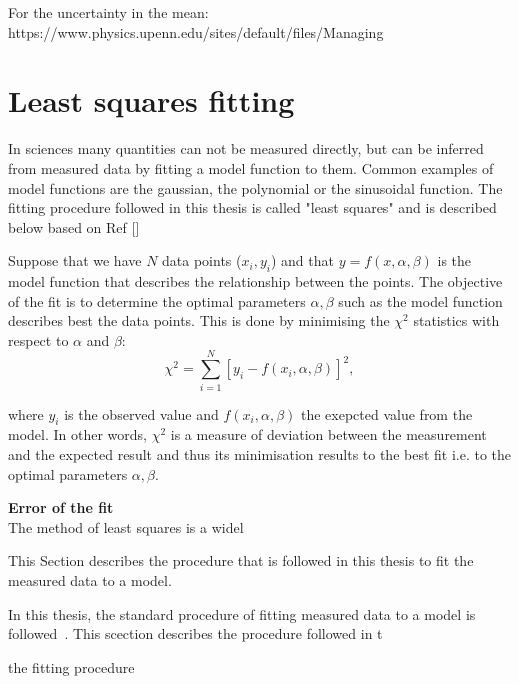For the uncertainty in the mean:
https://www.physics.upenn.edu/sites/default/files/Managing%


\section{Least squares fitting}\label{app:non_linear_fitting}
In sciences many quantities can not be measured directly, but can be inferred from measured data by fitting a model function to them. Common examples of model functions are the gaussian, the polynomial or the sinusoidal function. The fitting procedure followed in this thesis is called "least squares" and is described below based on Ref []

Suppose that we have $N$ data points ($x_{i}, y_{i}$) and that $y=f(x,\alpha, \beta)$ is the model function that describes the relationship between the points. The objective of the fit is to determine the optimal parameters $\alpha, \beta$ such as the model function describes best the data points. This is done by minimising the $\chi^2$ statistics with respect to $\alpha$ and $\beta$:
\begin{equation}\label{eq:chi_square}
    \chi^2 = \sum_{i=1}^{N}[y_{i}-f(x_{i},\alpha, \beta)]^2,
\end{equation}

where $y_{i}$ is the observed value and $f(x_{i},\alpha, \beta)$ the exepcted value from the model. In other words, $\chi^2$ is a measure of deviation between the measurement and the expected result and thus its minimisation results to the best fit i.e. to the optimal parameters $\alpha, \beta$.




\normalsize{\textbf{Error of the fit}}\\
The method of least squares is a widel

This Section describes the procedure that is followed in this thesis to fit the measured data to a model. 



In this thesis, the standard procedure of fitting measured data to a model is followed~\cite{gaus_fit_least_squares}. 
This scection describes the procedure followed in t


the fitting procedure